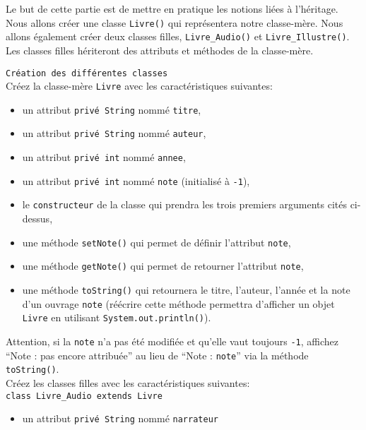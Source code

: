 Le but de cette partie est de mettre en pratique les notions liées à l'héritage. 
Nous allons créer une classe \lstinline{Livre()} qui représentera notre classe-mère. Nous allons également créer deux classes filles, \lstinline{Livre_Audio()} et \lstinline{Livre_Illustre()}. Les classes filles hériteront des attributs et méthodes de la classe-mère. \\

\begin{Exercice}[20 minutes] \lstinline{Création des différentes classes}\\
Créez la classe-mère \lstinline{Livre} avec les caractéristiques suivantes:
\begin{itemize}
	\item un attribut \lstinline{privé String} nommé \lstinline{titre},
	\item un attribut \lstinline{privé String} nommé \lstinline{auteur},
	\item un attribut \lstinline{privé int} nommé \lstinline{annee},
	\item un attribut \lstinline{privé int} nommé \lstinline{note} (initialisé à \lstinline{-1}),
	\item le \lstinline{constructeur} de la classe qui prendra les trois premiers arguments cités ci-dessus,
	\item une méthode \lstinline{setNote()} qui permet de définir l'attribut \lstinline{note},
	\item une méthode \lstinline{getNote()} qui permet de retourner l'attribut \lstinline{note},
	\item une méthode \lstinline{toString()} qui retournera le titre, l'auteur, l'année et la note d'un ouvrage \lstinline{note} (réécrire cette méthode permettra d'afficher un objet \lstinline{Livre} en utilisant \lstinline{System.out.println()}). \\
\end{itemize}

Attention, si la \lstinline{note} n'a pas été modifiée et qu'elle vaut toujours \lstinline{-1}, affichez ``Note : pas encore attribuée'' au lieu de ``Note : \lstinline{note}'' via la méthode \lstinline{toString()}. \\


Créez les classes filles avec les caractéristiques suivantes:\\
\lstinline{class Livre_Audio extends Livre}
\begin{itemize}
	\item un attribut \lstinline{privé String} nommé \lstinline{narrateur}


\end{itemize}
\end{Exercice}
